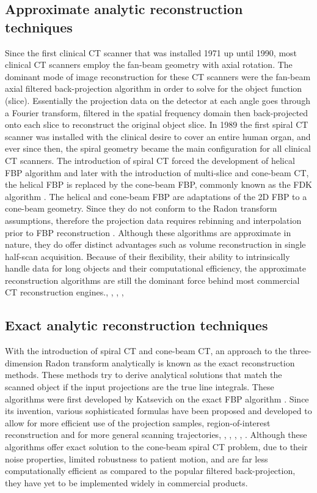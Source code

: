 \subsection{Approximate analytic reconstruction techniques}
Since the first clinical CT scanner that was installed 1971 up until 1990, most clinical CT scanners employ the fan-beam geometry with axial rotation.  The dominant mode of image reconstruction for these CT scanners were the fan-beam axial filtered back-projection algorithm in order to solve for the object function (slice).  Essentially the projection data on the detector at each angle goes through a Fourier transform, filtered in the spatial frequency domain then back-projected onto each slice to reconstruct the original object slice.  In 1989 the first spiral CT scanner was installed with the clinical desire to cover an entire human organ, and ever since then, the spiral geometry became the main configuration for all clinical CT scanners.  The introduction of spiral CT forced the development of helical FBP algorithm and later with the introduction of multi-slice and cone-beam CT, the helical FBP is replaced by the cone-beam FBP, commonly known as the FDK algorithm \citep{Feldkamp1984}.  The helical and cone-beam FBP are adaptations of the 2D FBP to a cone-beam geometry.  Since they do not conform to the Radon transform assumptions, therefore the projection data requires rebinning and interpolation prior to FBP reconstruction
.  Although these algorithms are approximate in nature, they do offer distinct advantages such as volume reconstruction in single half-scan acquisition.  Because of their flexibility, their ability to intrinsically handle data for long objects and their computational efficiency, the approximate reconstruction algorithms are still the dominant force behind most commercial CT reconstruction engines.\citep{Wang1993}, \citep{Hsieh}, \citep{Hsieh2007}, \citep{Tang2006}, \citep{Silver1998}

\subsection{Exact analytic reconstruction techniques}
With the introduction of spiral CT and cone-beam CT, an approach to the three-dimension Radon transform analytically is known as the exact reconstruction methods.  These methods try to derive analytical solutions that match the scanned object if the input projections are the true line integrals. These algorithms were first developed by Katsevich on the exact FBP algorithm \citep{Katsevich2002} \citep{Katsevich2003} \citep{Katsevich2002SIAM}.  Since its invention, various sophisticated formulas have been proposed and developed to allow for more efficient use of the projection samples, region-of-interest reconstruction and for more general scanning trajectories\citep{Chen2003}, \citep{Pan2004}, \citep{Zou2004}, \citep{Ye2005}, \citep{Zhuang2006}, \citep{Wang2008}.  Although these algorithms offer exact solution to the cone-beam spiral CT problem, due to their noise properties, limited robustness to patient motion, and are far less computationally efficient as compared to the popular filtered back-projection, they have yet to be implemented widely in commercial products.

